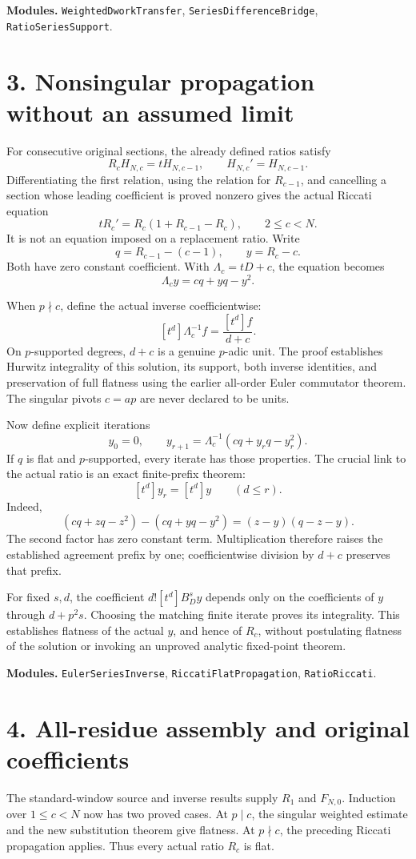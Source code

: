 \documentclass[11pt]{article}
\begin{document}
\textbf{Modules.} \texttt{WeightedDworkTransfer}, \texttt{SeriesDifferenceBridge}, \texttt{RatioSeriesSupport}.
\newpage
\section*{3. Nonsingular propagation without an assumed limit}
For consecutive original sections, the already defined ratios satisfy
\[
 R_cH_{N,c}=tH_{N,c-1},\qquad H_{N,c}'=H_{N,c-1}.
\]
Differentiating the first relation, using the relation for $R_{c-1}$, and cancelling a section whose leading coefficient is proved nonzero gives the actual Riccati equation
\[
 \boxed{tR_c'=R_c(1+R_{c-1}-R_c),\qquad 2\le c<N.}
\]
It is not an equation imposed on a replacement ratio. Write
\[
 q=R_{c-1}-(c-1),\qquad y=R_c-c.
\]
Both have zero constant coefficient. With $\Lambda_c=tD+c$, the equation becomes
\[
 \boxed{\Lambda_c y=cq+yq-y^2.}
\]

When $p\nmid c$, define the actual inverse coefficientwise:
\[
 [t^d]\Lambda_c^{-1}f=\frac{[t^d]f}{d+c}.
\]
On $p$-supported degrees, $d+c$ is a genuine $p$-adic unit. The proof establishes Hurwitz integrality of this solution, its support, both inverse identities, and preservation of full flatness using the earlier all-order Euler commutator theorem. The singular pivots $c=ap$ are never declared to be units.

Now define explicit iterations
\[
 y_0=0,\qquad y_{r+1}=\Lambda_c^{-1}(cq+y_rq-y_r^2).
\]
If $q$ is flat and $p$-supported, every iterate has those properties. The crucial link to the actual ratio is an exact finite-prefix theorem:
\[
 \boxed{[t^d]y_r=[t^d]y\qquad(d\le r).}
\]
Indeed,
\[
 (cq+zq-z^2)-(cq+yq-y^2)=(z-y)(q-z-y).
\]
The second factor has zero constant term. Multiplication therefore raises the established agreement prefix by one; coefficientwise division by $d+c$ preserves that prefix.

For fixed $s,d$, the coefficient $d![t^d]B_D^sy$ depends only on the coefficients of $y$ through $d+p^2s$. Choosing the matching finite iterate proves its integrality. This establishes flatness of the actual $y$, and hence of $R_c$, without postulating flatness of the solution or invoking an unproved analytic fixed-point theorem.

\textbf{Modules.} \texttt{EulerSeriesInverse}, \texttt{RiccatiFlatPropagation}, \texttt{RatioRiccati}.
\newpage
\section*{4. All-residue assembly and original coefficients}
The standard-window source and inverse results supply $R_1$ and $F_{N,0}$. Induction over $1\le c<N$ now has two proved cases. At $p\mid c$, the singular weighted estimate and the new substitution theorem give flatness. At $p\nmid c$, the preceding Riccati propagation applies. Thus every actual ratio $R_c$ is flat.
\end{document}
